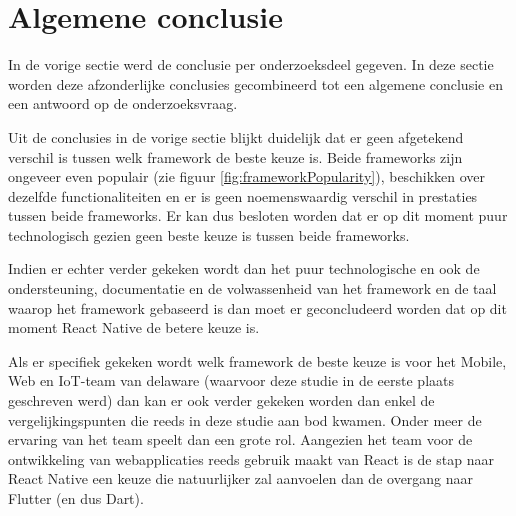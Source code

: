 \section{Algemene conclusie}
\label{sec:AlgemeneConclusie}

In de vorige sectie werd de conclusie per onderzoeksdeel gegeven. In deze sectie worden deze afzonderlijke conclusies gecombineerd tot een algemene conclusie en een antwoord op de onderzoeksvraag.

Uit de conclusies in de vorige sectie blijkt duidelijk dat er geen afgetekend verschil is tussen welk framework de beste keuze is. Beide frameworks zijn ongeveer even populair (zie figuur \ref{fig:frameworkPopularity}), beschikken over dezelfde functionaliteiten en er is geen noemenswaardig verschil in prestaties tussen beide frameworks. Er kan dus besloten worden dat er op dit moment puur technologisch gezien geen beste keuze is tussen beide frameworks.

Indien er echter verder gekeken wordt dan het puur technologische en ook de ondersteuning, documentatie en de volwassenheid van het framework en de taal waarop het framework gebaseerd is dan moet er geconcludeerd worden dat op dit moment React Native de betere keuze is. 

Als er specifiek gekeken wordt welk framework de beste keuze is voor het Mobile, Web en IoT-team van delaware (waarvoor deze studie in de eerste plaats geschreven werd) dan kan er ook verder gekeken worden dan enkel de vergelijkingspunten die reeds in deze studie aan bod kwamen. Onder meer de ervaring van het team speelt dan een grote rol. Aangezien het team voor de ontwikkeling van webapplicaties reeds gebruik maakt van React is de stap naar React Native een keuze die natuurlijker zal aanvoelen dan de overgang naar Flutter (en dus Dart). 





